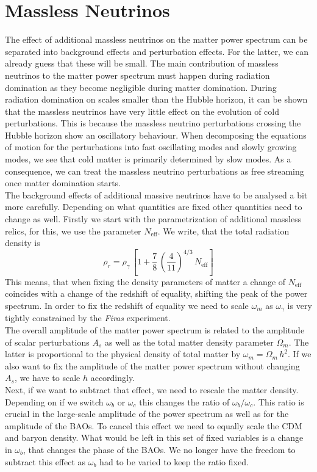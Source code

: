 \documentclass[../main.tex]{subfiles}
\begin{document}
\section{Massless Neutrinos}
The effect of additional massless neutrinos on the matter power spectrum can be separated into background effects and perturbation effects. For the latter, we can already guess that these will be small. The main contribution of massless neutrinos to the matter power spectrum must happen during radiation domination as they become negligible during matter domination. During radiation domination on scales smaller than the Hubble horizon, it can be shown that the massless neutrinos have very little effect on the evolution of cold perturbations. This is because the massless neutrino perturbations crossing the Hubble horizon show an oscillatory behaviour. When decomposing the equations of motion for the perturbations into fast oscillating modes and slowly growing modes, we see that cold matter is primarily determined by slow modes. As a consequence, we can treat the massless neutrino perturbations as free streaming once matter domination starts.\\
The background effects of additional massive neutrinos have to be analysed a bit more carefully. Depending on what quantities are fixed other quantities need to change as well. Firstly we start with the parametrization of additional massless relics, for this, we use the parameter $N_\mathrm{eff}$. We write, that the total radiation density is 
\begin{equation}
    \rho_r = \rho_\gamma\,\left[1+\frac{7}{8}\,\left(\frac{4}{11}\right)^{4/3}\,N_\mathrm{eff} \right]
\end{equation}
This means, that when fixing the density parameters of matter a change of $N_\mathrm{eff}$ coincides with a change of the redshift of equality, shifting the peak of the power spectrum. In order to fix the redshift of equality we need to scale $\omega_m$ as $\omega_\gamma$ is very tightly constrained by the {\it Firas} experiment.\\
The overall amplitude of the matter power spectrum is related to the amplitude of scalar perturbations $A_s$ as well as the total matter density parameter $\Omega_m$. The latter is proportional to the physical density of total matter by $\omega_m=\Omega_m\,h^2$. If we also want to fix the amplitude of the matter power spectrum without changing $A_s$, we have to scale $h$ accordingly.\\
Next, if we want to subtract that effect, we need to rescale the matter density. Depending on if we switch $\omega_b$ or $\omega_c$ this changes the ratio of $\omega_b/\omega_c$. This ratio is crucial in the large-scale amplitude of the power spectrum as well as for the amplitude of the BAOs. To cancel this effect we need to equally scale the CDM and baryon density. What would be left in this set of fixed variables is a change in $\omega_b$, that changes the phase of the BAOs. We no longer have the freedom to subtract this effect as $\omega_b$ had to be varied to keep the ratio fixed.\\
\end{document}
